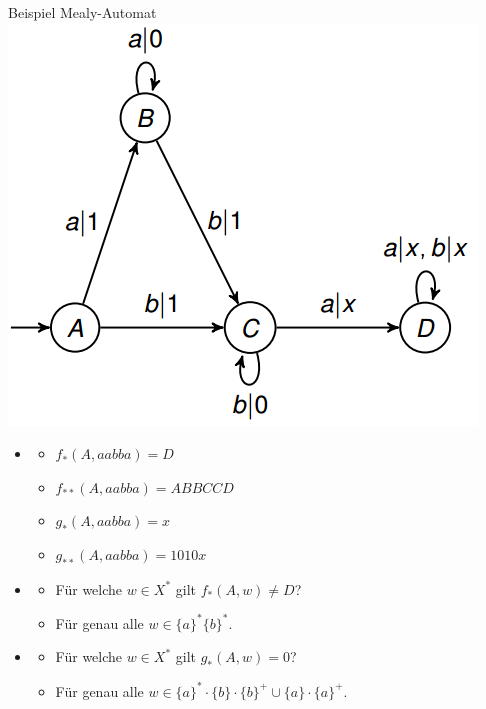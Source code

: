 \documentclass[handout]{beamer}
\begin{document}
\begin{frame}{Beispiel Mealy-Automat}
	\includegraphics[scale=0.5]{images/MealyBsp.png}
	\begin{itemize}
		\item<1|only@1>[] {
			\begin{itemize}
				\item \(f_* (A, aabba) = D\)
				\item \(f_{**} (A, aabba) = ABBCCD\)
				\item \(g_* (A, aabba) = x\)
				\item \(g_{**} (A, aabba) = 1010x\)		
			\end{itemize}
		}
		\item<2-3|only@2-3>[] {
			\begin{itemize}
				\item[] Für welche \(w \in X^*\) gilt \(f_* (A, w) \neq D\)? \pause \pause
				\item[] Für genau alle \(w \in \{a\}^* \{b\}^*\).
			\end{itemize}
		}
		\item<4-5|only@4-5>[] {
			\begin{itemize}
				\item[] Für welche \(w \in X^*\) gilt \(g_* (A, w) = 0\)? \pause \pause
				\item[] Für genau alle \(w \in \{a\}^* \cdot \{b\} \cdot \{b\}^+ \cup \{a\} \cdot \{a\}^+\).
			\end{itemize}
		}
	\end{itemize}
\end{frame}
\end{document}
